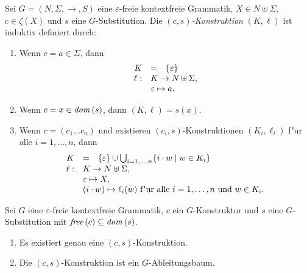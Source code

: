\documentclass[12pt,a4paper]{article}
\begin{document}
\begin{definition}[Konstruktion]
  Sei $G = (N,\Sigma,\to,S)$ eine $\varepsilon$-freie kontextfreie Grammatik, $X \in N \uplus \Sigma$,
  $c \in \zeta(X)$ und $s$ eine $G$-Substitution. Die
  \emph{$(c,s)$-Konstruktion} $(K,\ell)$ ist induktiv definiert durch:
  \begin{enumerate}
  \item Wenn $c = a \in \Sigma$, dann
    \[\begin{array}{rcl}
      K &=& \{\varepsilon\} \\
      \ell: & \multicolumn{2}{l}{K \to N \uplus \Sigma,} \\
      & \multicolumn{2}{l}{\varepsilon \mapsto a.} \\
    \end{array}\]
  \item Wenn $c = x \in \mathit{dom}\,(s)$, dann $(K,\ell) = s(x)$.
  \item Wenn $c = (c_1 \ldots c_n)$ und existieren $(c_i,s)$-Konstruktionen $(K_i,\ell_i)$ f"ur alle
    $i=1,\ldots,n$, dann
    \[\begin{array}{rcl}
      K &=& \{\varepsilon\} \cup \bigcup_{i=1,\ldots,n} \{i \cdot w \mid w \in K_i\} \\
      \ell: & \multicolumn{2}{l}{K \to N \uplus \Sigma,} \\
      & \multicolumn{2}{l}{\varepsilon \mapsto X,} \\
      & \multicolumn{2}{l}{(i \cdot w) \mapsto \ell_i(w) \text{ f"ur alle $i=1,\ldots,n$ und $w \in K_i$.}}
    \end{array}\]
  \end{enumerate}
\end{definition}

\begin{lemma}
  Sei $G$ eine $\varepsilon$-freie kontextfreie Grammatik, $c$ ein $G$-Konstruktor und
  $s$ eine $G$-Substitution mit $\mathit{free}\,(c) \subseteq \mathit{dom}\,(s)$.
  \begin{enumerate}
  \item Es existiert genau eine $(c,s)$-Konstruktion.
  \item Die $(c,s)$-Konstruktion ist ein $G$-Ableitungsbaum.
  \end{enumerate}
\end{lemma}
\end{document}
